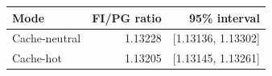\begin{tabular}{lrr}
\toprule
Mode & FI/PG ratio & 95\% interval\\\midrule
Cache-neutral & 1.13228 & [1.13136, 1.13302] \\
Cache-hot & 1.13205 & [1.13145, 1.13261] \\
\bottomrule
\end{tabular}
